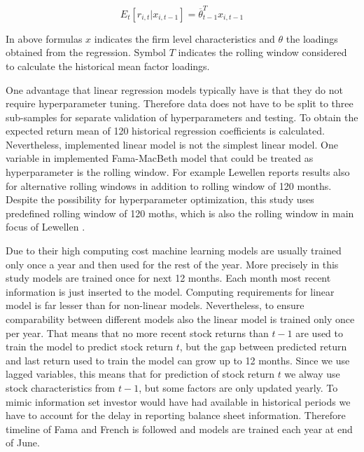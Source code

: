 \documentclass{article}
\begin{document}
\begin{equation}
E_t \left[ r_{i, t} | x_{i, t-1} \right] = \overline \theta_{t-1}^T x_{i, t-1}
\end{equation}

In above formulas $x$ indicates the firm level characteristics and $\theta$ the loadings obtained from the regression. Symbol $T$ indicates the rolling window considered to calculate the historical mean factor loadings. \par

One advantage that linear regression models typically have is that they do not require hyperparameter tuning. Therefore data  does not have to be split to three sub-samples for separate validation of hyperparameters and testing. To obtain the expected return mean of 120 historical regression coefficients is calculated. Nevertheless, implemented linear model is not the simplest linear model. One variable in implemented Fama-MacBeth model that could be treated as hyperparameter is the rolling window. For example Lewellen \citeyear{Lewellen2015} reports results also for alternative rolling windows in addition to rolling window of 120 months. Despite the possibility for hyperparameter optimization, this study uses predefined rolling window of 120 moths, which is also the rolling window in main focus of Lewellen \citeyear{Lewellen2015}. \par

Due to their high computing cost machine learning models are usually trained only once a year and then used for the rest of the year. More precisely in this study models are trained once for next 12 months. Each month most recent information is just inserted to the model. Computing requirements for linear model is far lesser than for non-linear models. Nevertheless, to ensure comparability between different models also the linear model is trained only once per year. That means that no more recent stock returns than $t-1$ are used to train the model to predict stock return $t$, but the gap between predicted return and last return used to train the model can grow up to 12 months. Since we use lagged variables, this means that for prediction of stock return $t$ we alway use stock characteristics from $t-1$, but some factors are only updated yearly. To mimic information set investor would have had available in historical periods we have to account for the delay in reporting balance sheet information. Therefore timeline of Fama and French \citeyear{FAMA19933} is followed and models are trained each year at end of June. \par
\end{document}
